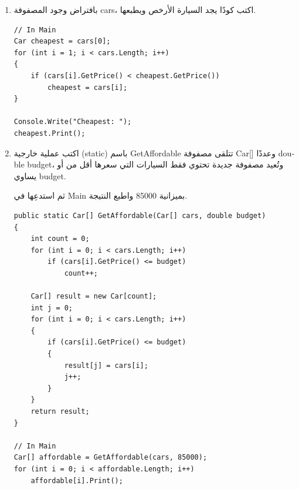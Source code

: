 \documentclass[14pt]{extarticle}
\begin{document}
\begin{enumerate}
\ifwithsols
\begin{boxSolution}
\begin{english}
{\small
\begin{verbatim}
// In Main
double total = 0;
for (int i = 0; i < cars.Length; i++)
    total += cars[i].GetPrice();

Console.WriteLine("Total: " + total + " NIS");
\end{verbatim}
}
\end{english}
\end{boxSolution}
\clearpage
\fi

\item
بافتراض وجود المصفوفة \textenglish{cars}، اكتب كودًا يجد السيارة الأرخص ويطبعها.

\ifwithsols
\begin{boxSolution}
\begin{english}
{\small
\begin{verbatim}
// In Main
Car cheapest = cars[0];
for (int i = 1; i < cars.Length; i++)
{
    if (cars[i].GetPrice() < cheapest.GetPrice())
        cheapest = cars[i];
}

Console.Write("Cheapest: ");
cheapest.Print();
\end{verbatim}
}
\end{english}
\end{boxSolution}
\clearpage
\fi

\item
اكتب عملية خارجية (\textenglish{static}) باسم \textenglish{GetAffordable}
تتلقى مصفوفة \textenglish{Car[]} وعددًا \textenglish{double budget}،
وتُعيد مصفوفة جديدة تحتوي فقط السيارات التي سعرها أقل من أو يساوي \textenglish{budget}.

ثم استدعِها في \textenglish{Main} بميزانية \textenglish{85000} واطبع النتيجة.

\ifwithsols
\begin{boxSolution}
\begin{english}
{\small
\begin{verbatim}
public static Car[] GetAffordable(Car[] cars, double budget)
{
    int count = 0;
    for (int i = 0; i < cars.Length; i++)
        if (cars[i].GetPrice() <= budget)
            count++;

    Car[] result = new Car[count];
    int j = 0;
    for (int i = 0; i < cars.Length; i++)
    {
        if (cars[i].GetPrice() <= budget)
        {
            result[j] = cars[i];
            j++;
        }
    }
    return result;
}

// In Main
Car[] affordable = GetAffordable(cars, 85000);
for (int i = 0; i < affordable.Length; i++)
    affordable[i].Print();
\end{verbatim}
}
\end{english}
\end{boxSolution}
\fi

\end{enumerate}
\end{document}
